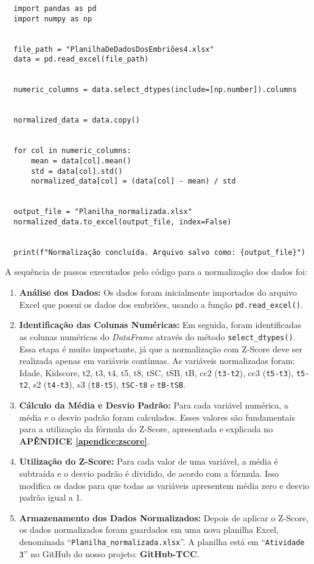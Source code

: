 \begin{lstlisting}
  import pandas as pd
  import numpy as np
  
  
  file_path = "PlanilhaDeDadosDosEmbriões4.xlsx"  
  data = pd.read_excel(file_path)
  
  
  numeric_columns = data.select_dtypes(include=[np.number]).columns
  
  
  normalized_data = data.copy()
  
  
  for col in numeric_columns:
      mean = data[col].mean()
      std = data[col].std()
      normalized_data[col] = (data[col] - mean) / std
  
  
  output_file = "Planilha_normalizada.xlsx"
  normalized_data.to_excel(output_file, index=False)
  
  
  print(f"Normalização concluída. Arquivo salvo como: {output_file}")
\end{lstlisting}  

A sequência de passos executados pelo código para a normalização dos dados foi:

\begin{enumerate}
    \item \textbf{Análise dos Dados:} Os dados foram inicialmente importados do arquivo Excel que possui os dados dos embriões, usando a função \texttt{pd.read\_excel()}.
    
    \item \textbf{Identificação das Colunas Numéricas:} Em seguida, foram identificadas as colunas numéricas do \textit{DataFrame} através do método \texttt{select\_dtypes()}. Essa etapa é muito importante, já que a normalização com Z-Score deve ser realizada apenas em variáveis contínuas. As variáveis normalizadas foram: Idade, Kidscore, t2, t3, t4, t5, t8, tSC, tSB, tB, cc2 (\texttt{t3-t2}), cc3 (\texttt{t5-t3}), \texttt{t5-t2}, s2 (\texttt{t4-t3}), s3 (\texttt{t8-t5}), \texttt{tSC-t8} e \texttt{tB-tSB}.
    
    \item \textbf{Cálculo da Média e Desvio Padrão:} Para cada variável numérica, a média e o desvio padrão foram calculados. Esses valores são fundamentais para a utilização da fórmula do Z-Score, apresentada e explicada no \textbf{APÊNDICE \ref{apendice:zscore}}.
    
    \item \textbf{Utilização do Z-Score:} Para cada valor de uma variável, a média é subtraída e o desvio padrão é dividido, de acordo com a fórmula. Isso modifica os dados para que todas as variáveis apresentem média zero e desvio padrão igual a 1.
    
    \item \textbf{Armazenamento dos Dados Normalizados:} Depois de aplicar o Z-Score, os dados normalizados foram guardados em uma nova planilha Excel, denominada “\texttt{Planilha\_normalizada.xlsx}”. A planilha está em “\texttt{Atividade 3}” no GitHub do nosso projeto: \textbf{GitHub-TCC}.
\end{enumerate}

